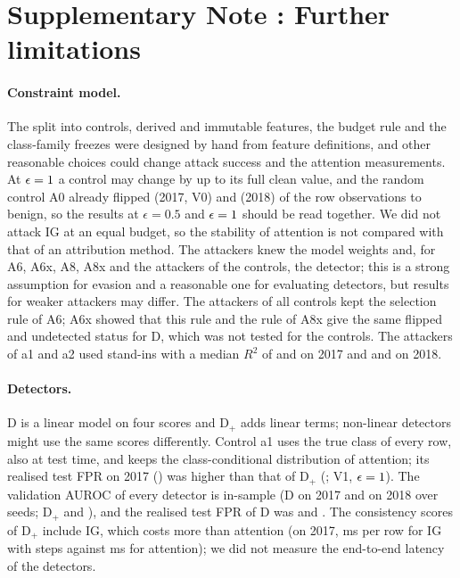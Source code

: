 \section*{Supplementary Note \suppNoteLimits: Further limitations}
\label{sec:si_limits}
\paragraph{Constraint model.}
The split into \nControls{} controls, \nDerived{} derived and \nImmutable{} immutable features, the budget rule and the
class-family freezes were designed by hand from feature definitions, and other reasonable choices could change attack
success and the attention measurements.
At $\epsilon = 1$ a control may change by up to its full clean value, and the random control A0 already
flipped \azeroBenignShareVzeroSeventeen{} (2017, V0) and \azeroBenignShareVzeroEighteen{} (2018) of the row
observations to benign, so the results at $\epsilon = 0.5$ and $\epsilon = 1$ should be read together.
We did not attack IG at an equal budget, so the stability of attention is not compared with that of an attribution
method.
The attackers knew the model weights and, for A6, A6x, A8, A8x and the attackers of the controls, the detector; this is
a strong assumption for evasion and a reasonable one for evaluating detectors, but results for weaker attackers may
differ.
The attackers of all controls kept the selection rule of A6; A6x showed that this rule and the rule of A8x give the
same flipped and undetected status for D, which was not tested for the controls.
The attackers of a1 and a2 used stand-ins with a median $R^2$ of \rtwoMedAoneSeventeen{} and \rtwoMedAtwoSeventeen{} on
2017 and \rtwoMedAoneEighteen{} and \rtwoMedAtwoEighteen{} on 2018.

\paragraph{Detectors.}
D is a linear model on four scores and D$_+$ adds \nConsistency{} linear terms; non-linear detectors might use the same
scores differently.
Control a1 uses the true class of every row, also at test time, and keeps the class-conditional distribution of
attention; its realised test FPR on 2017 (\ablFprAoneSeventeen) was higher than that of D$_+$
(\ablFprDplusSeventeen; V1, $\epsilon = 1$).
The validation AUROC of every detector is in-sample (D \valAurocDSeventeenRange{} on 2017 and \valAurocDEighteenRange{}
on 2018 over seeds; D$_+$ \valAurocDplusSeventeenRange{} and \valAurocDplusEighteenRange), and the realised test FPR of
D was \testFprDSeventeenRange{} and \testFprDEighteenRange.
The consistency scores of D$_+$ include IG, which costs more than attention (on 2017, \msPerRowIGRange{} ms per row
for IG with \apIGSteps{} steps against \msPerRowAttnRange{} ms for attention); we did not measure the end-to-end
latency of the detectors.

